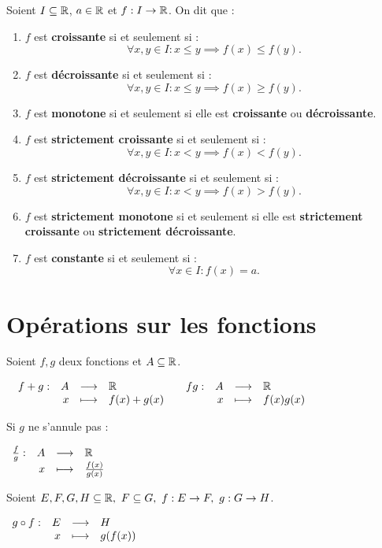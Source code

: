 \begin{definition}
	Soient $I \subseteq \mathbb{R}$, $a \in \mathbb{R}$ et $f : I \to \mathbb{R}$. On dit que :
    \begin{enumerate}
        \item $f$ est \textbf{croissante} si et seulement si :
        \[ \forall x, y \in I : x \leq y \implies f(x) \leq f(y). \]
        \item $f$ est \textbf{décroissante} si et seulement si : 
        \[ \forall x, y \in I : x \leq y \implies f(x) \geq f(y). \]
        \item $f$ est \textbf{monotone} si et seulement si elle est \textbf{croissante} ou \textbf{décroissante}.
        \item $f$ est \textbf{strictement croissante} si et seulement si : 
        \[ \forall x, y \in I : x < y \implies f(x) < f(y). \]
        \item $f$ est \textbf{strictement décroissante} si et seulement si :
        \[ \forall x, y \in I : x < y \implies f(x) > f(y). \]
        \item $f$ est \textbf{strictement monotone} si et seulement si elle est \textbf{strictement croissante} ou \textbf{strictement décroissante}.
        \item $f$ est \textbf{constante} si et seulement si :
        \[ \forall x \in I : f(x) = a. \]
    \end{enumerate}
\end{definition}

\section{Opérations sur les fonctions}
\begin{definition}
	Soient $f, g$ deux fonctions et $A \subseteq \mathbb{R}$.
	\begin{center}
		$
		\begin{array}{cc}
			\begin{array}{rrcl} f+g : & A & \longrightarrow & \mathbb{R} \\ & x & \longmapsto & f(x)+g(x) \end{array}
			&
			\begin{array}{rrcl} fg : & A & \longrightarrow & \mathbb{R} \\ & x & \longmapsto & f(x)g(x) \end{array}
		\end{array}
		$
	\end{center}
	Si $g$ ne s'annule pas :
	\begin{center}
		$
		\begin{array}{rrcl} \frac{f}{g} : & A & \longrightarrow & \mathbb{R} \\ & x & \longmapsto & \frac{f(x)}{g(x)} \end{array}
		$
	\end{center}
\end{definition}

\begin{definition}
	Soient $E, F, G, H \subseteq \mathbb{R},\ F \subseteq G,\ f : E \to F,\ g : G \to H$.
	\begin{center}
		$
		\begin{array}{rrcl} g \circ f : & E & \longrightarrow & H \\ & x & \longmapsto & g(f(x)) \end{array}
		$
	\end{center}
\end{definition}

